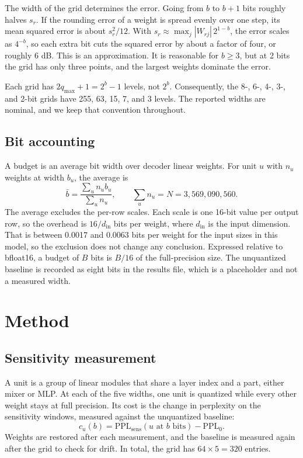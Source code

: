 \documentclass[11pt]{article}
\begin{document}
The width of the grid determines the error. Going from $b$ to $b+1$ bits roughly halves $s_r$. If the rounding error of a weight is spread evenly over one step, its mean squared error is about $s_r^2/12$. With $s_r \approx \max_j |W_{rj}|\, 2^{1-b}$, the error scales as $4^{-b}$, so each extra bit cuts the squared error by about a factor of four, or roughly 6 dB. This is an approximation. It is reasonable for $b \ge 3$, but at 2 bits the grid has only three points, and the largest weights dominate the error.

Each grid has $2q_{\max} + 1 = 2^b - 1$ levels, not $2^b$. Consequently, the 8-, 6-, 4-, 3-, and 2-bit grids have 255, 63, 15, 7, and 3 levels. The reported widths are nominal, and we keep that convention throughout.

\subsection{Bit accounting}

A budget is an average bit width over decoder linear weights. For unit $u$ with $n_u$ weights at width $b_u$, the average is
\begin{equation}
\bar b = \frac{\sum_u n_u b_u}{\sum_u n_u}, \qquad \sum_u n_u = N = 3{,}569{,}090{,}560.
\end{equation}
The average excludes the per-row scales. Each scale is one 16-bit value per output row, so the overhead is $16/d_{\mathrm{in}}$ bits per weight, where $d_{\mathrm{in}}$ is the input dimension. That is between 0.0017 and 0.0063 bits per weight for the input sizes in this model, so the exclusion does not change any conclusion. Expressed relative to bfloat16, a budget of $B$ bits is $B/16$ of the full-precision size. The unquantized baseline is recorded as eight bits in the results file, which is a placeholder and not a measured width.

\section{Method}

\subsection{Sensitivity measurement}

A unit is a group of linear modules that share a layer index and a part, either mixer or MLP. At each of the five widths, one unit is quantized while every other weight stays at full precision. Its cost is the change in perplexity on the sensitivity windows, measured against the unquantized baseline:
\begin{equation}
c_u(b) = \mathrm{PPL}_{\mathrm{sens}}(u \text{ at } b \text{ bits}) - \mathrm{PPL}_0.
\end{equation}
Weights are restored after each measurement, and the baseline is measured again after the grid to check for drift. In total, the grid has $64 \times 5 = 320$ entries.
\end{document}
